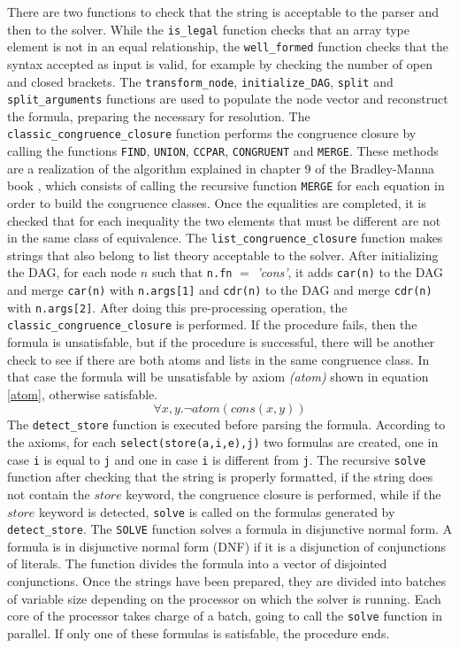 \documentclass{IEEEtran}
\begin{document}
There are two functions to check that the string is acceptable to the parser and then to the solver. While the \verb|is_legal| function checks that an array type element is not in an equal relationship, the \verb|well_formed| function checks that the syntax accepted as input is valid, for example by checking the number of open and closed brackets. The \verb|transform_node|, \verb|initialize_DAG|, \verb|split| and \verb|split_arguments| functions are used to populate the node vector and reconstruct the formula, preparing the necessary for resolution. The \verb|classic_congruence_closure| function performs the congruence closure by calling the functions \verb|FIND|, \verb|UNION|, \verb|CCPAR|, \verb|CONGRUENT| and \verb|MERGE|. These methods are a realization of the algorithm explained in chapter 9 of the Bradley-Manna book \cite{10.5555/1324777}, which consists of calling the recursive function \verb|MERGE| for each equation in order to build the congruence classes. Once the equalities are completed, it is checked that for each inequality the two elements that must be different are not in the same class of equivalence. The \verb|list_congruence_closure| function makes strings that also belong to list theory acceptable to the solver. After initializing the DAG, for each node $n$ such that \verb|n.fn| $=$ \textit{'cons'}, it adds \verb|car(n)| to the DAG and merge \verb|car(n)| with \verb|n.args[1]| and \verb|cdr(n)| to the DAG and merge \verb|cdr(n)| with \verb|n.args[2]|. After doing this pre-processing operation, the \verb|classic_congruence_closure| is performed. If the procedure fails, then the formula is unsatisfable, but if the procedure is successful, there will be another check to see if there are both atoms and lists in the same congruence class. In that case the formula will be unsatisfable by axiom \textit{(atom)} shown in equation \ref{atom}, otherwise satisfable.
\begin{equation}
	\label{atom}
	\forall x,y. \neg atom(cons(x,y))
\end{equation}
The \verb|detect_store| function is executed before parsing the formula. According to the axioms, for each \verb|select(store(a,i,e),j)| two formulas are created, one in case \verb|i| is equal to \verb|j| and one in case \verb|i| is different from \verb|j|. The recursive \verb|solve| function after checking that the string is properly formatted, if the string does not contain the $store$ keyword, the congruence closure is performed, while if the $store$ keyword is detected, \verb|solve| is called on the formulas generated by \verb|detect_store|. The \verb|SOLVE| function solves a formula in disjunctive normal form. A formula is in disjunctive normal form (DNF) if it is a disjunction of conjunctions of literals. The function divides the formula into a vector of disjointed conjunctions. Once the strings have been prepared, they are divided into batches of variable size depending on the processor on which the solver is running. Each core of the processor takes charge of a batch, going to call the \verb|solve| function in parallel. If only one of these formulas is satisfable, the procedure ends.
\end{document}
